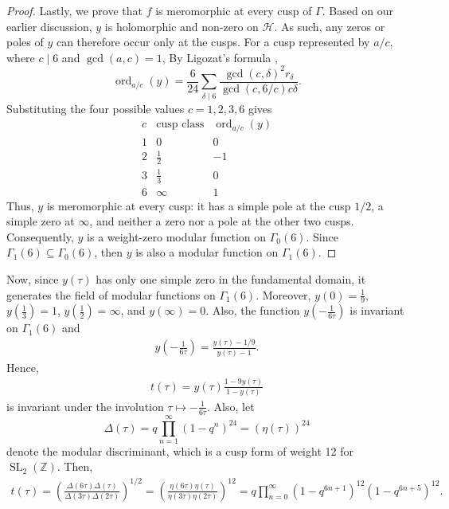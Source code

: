 \documentclass[12pt, a4paper]{amsart}
\theoremstyle{definition}
\numberwithin{theorem}{section}
\begin{document}
\begin{proof}
Lastly, we prove that $f$ is meromorphic at every cusp of $\Gamma$. Based on our earlier discussion, $y$ is holomorphic and non-zero on $\mathcal{H}$. As such, any zeros or poles of $y$ can therefore occur only at the cusps. For a cusp represented by \(a/c\), where \(c\mid 6\) and \(\gcd\left(a,c\right)=1\), By Ligozat's formula \cite{RouseWebb2015, Ligozat1975, McMurdy2001},
\[\operatorname{ord}_{a/c}\left(y\right)=\frac{6}{24}
\sum_{\delta\mid 6}\frac{\gcd\left(c,\delta\right)^2r_\delta}{\gcd\left(c,6/c\right)c\delta}.\]
Substituting the four possible values \(c=1,2,3,6\) gives
\[
\begin{array}{c|c|c}
c & \text{cusp class}
  & \operatorname{ord}_{a/c}\left(y\right)\\
\hline
1 & 0              & 0\\
2 & \frac12       & -1\\
3 & \frac13       & 0\\
6 & \infty         & 1
\end{array}
\]
Thus, \(y\) is meromorphic at every cusp: it has a simple pole at the cusp \(1/2\), a simple zero at \(\infty\), and neither a zero nor a pole at the other two cusps. Consequently, \(y\) is a weight-zero modular function on \(\Gamma_0\left(6\right)\). Since $\Gamma_1\left(6\right)\subseteq\Gamma_0\left(6\right)$, then \(y\) is also a modular function on
\(\Gamma_1\left(6\right)\).
\end{proof}
Now, since $y\left(\tau\right)$ has only one simple zero in the fundamental domain, it generates the field of modular functions on $\Gamma_1\left(6\right)$. Moreover, $y\left(0\right)=\frac{1}{9}$, $y\left(\frac{1}{3}\right)=1$, $y\left(\frac{1}{2}\right)=\infty$, and $y\left(\infty\right)=0$. Also, the function $y\left(-\frac{1}{6\tau}\right)$ is invariant on $\Gamma_1\left(6\right)$ and \begin{align}\label{eqn: eqn:y-fricke-transformation}
y\left(-\frac{1}{6\tau}\right)=\frac{y\left(\tau\right)-1/9}{y\left(\tau\right)-1}.
\end{align}
Hence, \begin{align}\label{eqn: equation involving t} t\left(\tau\right)=y\left(\tau\right)\frac{1-9y\left(\tau\right)}{1-y\left(\tau\right)}
\end{align}
is invariant under the involution $\tau\mapsto -\frac{1}{6\tau}$. Also, let 
\[\Delta\left(\tau\right)=q\prod_{n=1}^{\infty}\left(1-q^n\right)^{24}=\left(\eta\left(\tau\right)\right)^{24}\]
denote the modular discriminant, which is a cusp form of weight 12 for $\operatorname{SL}_2\left(\mathbb{Z}\right)$. Then, \begin{align}\label{eqn: beukers formula for t}
t\left(\tau\right)=\left(\frac{\Delta\left(6\tau\right)\Delta\left(\tau\right)}{\Delta\left(3\tau\right)\Delta\left(2\tau\right)}\right)^{1/2}=\left(\frac{\eta\left(6\tau\right)\eta\left(\tau\right)}{\eta\left(3\tau\right)\eta\left(2\tau\right)}\right)^{12}=q\prod_{n=0}^{\infty}\left(1-q^{6n+1}\right)^{12}\left(1-q^{6n+5}\right)^{12}.
\end{align}
\end{document}
